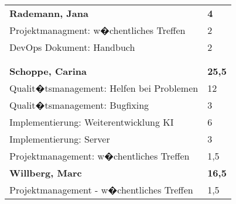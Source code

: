 \documentclass[a4paper,11pt]{scrartcl}
\begin{document}
\begin{longtable}{| p{13.8cm} | C{2.4cm} |}

	&

	\\
	\hline
	\hline


	\textbf{Rademann, Jana} & \textbf{4}\\ %
	\hline

  Projektmanagment: w�chentliches Treffen
	&
  2
	\\
	\hline

  DevOps Dokument: Handbuch
	&
  2
	\\
	\hline


	&

	\\
	\hline


	&

	\\
	\hline
	\hline


	\textbf{Schoppe, Carina} & \textbf{25,5}\\ %
	\hline

  Qualit�tsmanagement: Helfen bei Problemen
	&
  12
	\\
	\hline

  Qualit�tsmanagement: Bugfixing
	&
  3
	\\
	\hline

  Implementierung: Weiterentwicklung KI
	&
  6
	\\
	\hline

  Implementierung: Server
	&
  3
	\\
	\hline

  Projektmanagement: w�chentliches Treffen
	&
  1,5
	\\
	\hline
	\hline


	\textbf{Willberg, Marc} & \textbf{16,5}\\ %
	\hline

  Projektmanagement - w�chentliches Treffen
	&
  1,5
	\\
	\hline


\end{longtable}
\end{document}
